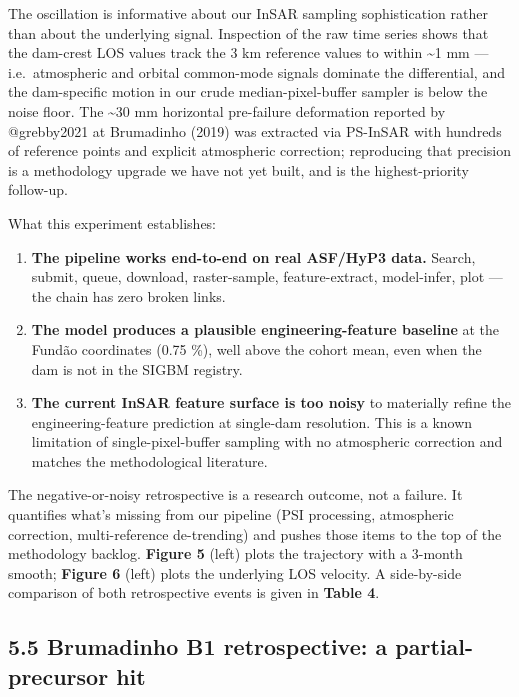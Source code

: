 \documentclass[
  11pt]{article}
\providecommand{\tightlist}{%
  \setlength{\itemsep}{0pt}\setlength{\parskip}{0pt}}
\begin{document}
The oscillation is informative about our InSAR sampling sophistication
rather than about the underlying signal. Inspection of the raw time
series shows that the dam-crest LOS values track the 3 km reference
values to within \textasciitilde1 mm --- i.e.~atmospheric and orbital
common-mode signals dominate the differential, and the dam-specific
motion in our crude median-pixel-buffer sampler is below the noise
floor. The \textasciitilde30 mm horizontal pre-failure deformation
reported by @grebby2021 at Brumadinho (2019) was extracted via PS-InSAR
with hundreds of reference points and explicit atmospheric correction;
reproducing that precision is a methodology upgrade we have not yet
built, and is the highest-priority follow-up.

What this experiment establishes:

\begin{enumerate}
\def\labelenumi{\arabic{enumi}.}
\tightlist
\item
  \textbf{The pipeline works end-to-end on real ASF/HyP3 data.} Search,
  submit, queue, download, raster-sample, feature-extract, model-infer,
  plot --- the chain has zero broken links.
\item
  \textbf{The model produces a plausible engineering-feature baseline}
  at the Fundão coordinates (0.75 \%), well above the cohort mean, even
  when the dam is not in the SIGBM registry.
\item
  \textbf{The current InSAR feature surface is too noisy} to materially
  refine the engineering-feature prediction at single-dam resolution.
  This is a known limitation of single-pixel-buffer sampling with no
  atmospheric correction and matches the methodological literature.
\end{enumerate}

The negative-or-noisy retrospective is a research outcome, not a
failure. It quantifies what's missing from our pipeline (PSI processing,
atmospheric correction, multi-reference de-trending) and pushes those
items to the top of the methodology backlog. \textbf{Figure 5} (left)
plots the trajectory with a 3-month smooth; \textbf{Figure 6} (left)
plots the underlying LOS velocity. A side-by-side comparison of both
retrospective events is given in \textbf{Table 4}.

\subsection{5.5 Brumadinho B1 retrospective: a partial-precursor
hit}\label{brumadinho-b1-retrospective-a-partial-precursor-hit}
\end{document}
